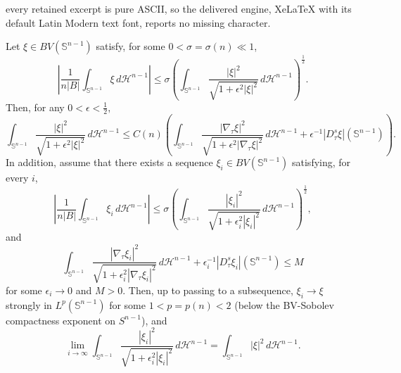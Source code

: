 \documentclass[10pt,a4paper]{amsart}
\def\ez{\epsilon}
\def\sz{\sigma}
\begin{document}
every retained excerpt is pure ASCII, so the delivered engine, XeLaTeX with its default Latin Modern text font, reports no missing character.
\begin{lem}\label{strong l2}
Let $\xi \in {BV(\mathbb S^{n-1})}$ satisfy, for some  $0<\sz=\sz(n)\ll1$,
\begin{equation}\label{small average}
    \left|\frac{1}{ n|B|}\int_{\mathbb S^{n-1}}\xi\,  d\mathscr H^{n-1}\right|\le \sz \left(\int_{\mathbb S^{n-1}} \frac{|\xi|^2}{\sqrt{1+\ez^2|\xi|^2}} \,d\mathscr H^{n-1}\right)^{\frac 1 2}.
\end{equation}
 Then,  for any $0<\ez<\frac 1 2,$
$$   \int_{\mathbb S^{n-1}} \frac{|\xi|^2}{\sqrt{1+\ez^2|\xi|^2}} \,d\mathscr H^{n-1}\le C(n)\left( \int_{\mathbb S^{n-1}} \frac{|\nabla_\tau  \xi|^2}{\sqrt{1+\ez^2|\nabla_\tau \xi|^2}} \,
 d\mathscr H^{n-1}+\ez^{-1} |D^s_\tau \xi|(\mathbb S^{n-1})\right).$$
In addition, assume that there exists a sequence $\xi_i\in BV(\mathbb S^{n-1})$ satisfying, for every $i$,
\begin{equation}\label{small average seq}
    \left|\frac{1}{ n|B|}\int_{\mathbb S^{n-1}}\xi_i\,  d\mathscr H^{n-1}\right|\le \sz \left(\int_{\mathbb S^{n-1}} \frac{|\xi_i|^2}{\sqrt{1+\ez_i^2|\xi_i|^2}} \,d\mathscr H^{n-1}\right)^{\frac 1 2},
\end{equation}
and
$$\int_{\mathbb S^{n-1}} \frac{|\nabla_\tau  \xi_i|^2}{\sqrt{1+\ez_i^2|\nabla_\tau \xi_i|^2}} \,
 d\mathscr H^{n-1}+ \epsilon_i^{-1}|D^s_\tau \xi_i|(\mathbb S^{n-1})\le M$$
for some $\ez_i\to 0$ and $M>0$.
Then, up to passing to a subsequence,
$\xi_i \to \xi$   strongly in $L^p (\mathbb S^{n-1})$ for some $1<p=p(n)<2$ (below the BV-Sobolev compactness exponent on $S^{n-1}$),
and
\begin{equation}
    \label{eq:xi_i to xi}
\lim_{i\to \infty}\int_{\mathbb S^{n-1}} \frac{|\xi_i|^2}{\sqrt{1+\ez_i^2|\xi_i|^2}} \,d\mathscr H^{n-1}=  \int_{\mathbb S^{n-1}} {|\xi|^2}  \,d\mathscr H^{n-1}.
\end{equation}
\end{lem}
\end{document}
